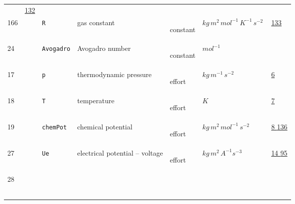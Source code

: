 \begin{longtable}{|p{1cm}|p{2.5cm}|p{4.5cm}|p{8cm}|p{3.0cm}|p{3cm}|p{1cm}|}
             &                 \hyperlink{"e:132"}{ 132 }
                 \\
        166
             & \hypertarget{"v:166"}{ $ {} $}
             & \verb|R|
             & gas constant
             & \begin{lay}constant \end{lay}
             & $ kg \,m^{2} \,mol^{-1} \,K^{-1} \,s^{-2} \, $
             &                 \hyperlink{"e:133"}{ 133 }
                 \\
        24
             & \hypertarget{"v:24"}{ $ {} $}
             & \verb|Avogadro|
             & Avogadro number
             & \begin{lay}constant \end{lay}
             & $ mol^{-1} \, $
             & \\
        17
             & \hypertarget{"v:17"}{ $ {} $}
             & \verb|p|
             & thermodynamic pressure
             & \begin{lay}effort \end{lay}
             & $ kg \,m^{-1} \,s^{-2} \, $
             &                 \hyperlink{"e:6"}{ 6 }
                 \\
        18
             & \hypertarget{"v:18"}{ $ {} $}
             & \verb|T|
             & temperature
             & \begin{lay}effort \end{lay}
             & $ K \, $
             &                 \hyperlink{"e:7"}{ 7 }
                 \\
        19
             & \hypertarget{"v:19"}{ $ {} $}
             & \verb|chemPot|
             & chemical potential
             & \begin{lay}effort \end{lay}
             & $ kg \,m^{2} \,mol^{-1} \,s^{-2} \, $
             &                 \hyperlink{"e:8"}{ 8 }
                                 \hyperlink{"e:136"}{ 136 }
                 \\
        27
             & \hypertarget{"v:27"}{ $ {} $}
             & \verb|Ue|
             & electrical potential -- voltage
             & \begin{lay}effort \end{lay}
             & $ kg \,m^{2} \,A^{-1} s^{-3} \, $
             &                 \hyperlink{"e:14"}{ 14 }
                                 \hyperlink{"e:95"}{ 95 }
                 \\
        28
             & \hypertarget{"v:28"}{ $ {} $}

\end{longtable}

